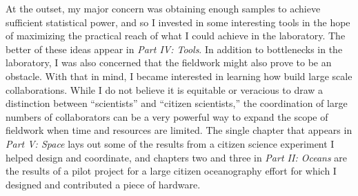 At the outset, my major concern was obtaining enough samples to achieve sufficient statistical power, and so I invested in some interesting tools in the hope of maximizing the practical reach of what I could achieve in the laboratory. The better of these ideas appear in {\em Part IV: Tools}. In addition to bottlenecks in the laboratory, I was also concerned that the fieldwork might also prove to be an obstacle. With that in mind, I became interested in learning how build large scale collaborations. While I do not believe it is equitable or veracious to draw a distinction between ``scientists'' and ``citizen scientists,'' the coordination of large numbers of collaborators can be a very powerful way to expand the scope of fieldwork when time and resources are limited. The single chapter that appears in {\em Part V: Space} lays out some of the results from a citizen science experiment I helped design and coordinate, and chapters two and three in {\em Part II: Oceans} are the results of a pilot project for a large citizen oceanography effort for which I designed and contributed a piece of hardware.

\printbibliography[heading=subbibliography]